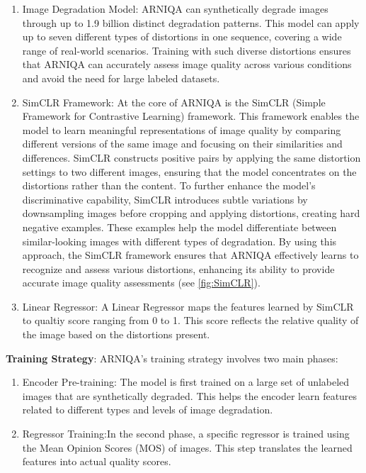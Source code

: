 \begin{enumerate}
    \item Image Degradation Model: ARNIQA can synthetically degrade images through up to 1.9 billion distinct degradation patterns. This model can apply up to seven different types of distortions in one sequence, covering a wide range of real-world scenarios. Training with such diverse distortions ensures that ARNIQA can accurately assess image quality across various conditions and avoid the need for large labeled datasets.
    \item SimCLR Framework: At the core of ARNIQA is the SimCLR (Simple Framework for Contrastive Learning) framework. This framework enables the model to learn meaningful representations of image quality by comparing different versions of the same image and focusing on their similarities and differences. SimCLR constructs positive pairs by applying the same distortion settings to two different images, ensuring that the model concentrates on the distortions rather than the content. To further enhance the model’s discriminative capability, SimCLR introduces subtle variations by downsampling images before cropping and applying distortions, creating hard negative examples. These examples help the model differentiate between similar-looking images with different types of degradation. By using this approach, the SimCLR framework ensures that ARNIQA effectively learns to recognize and assess various distortions, enhancing its ability to provide accurate image quality assessments (see \autoref{fig:SimCLR}).
    \item Linear Regressor: A Linear Regressor maps the features learned by SimCLR to qualtiy score ranging from 0 to 1. This score reflects the relative quality of the image based on the distortions present.
\end{enumerate}
\vspace{\baselineskip}
\noindent
\textbf{Training Strategy}: ARNIQA’s training strategy involves two main phases: \par
\begin{enumerate}
    \item Encoder Pre-training: The model is first trained on a large set of unlabeled images that are synthetically degraded. This helps the encoder learn features related to different types and levels of image degradation.
    \item Regressor Training:In the second phase, a specific regressor is trained using the Mean Opinion Scores (MOS) of images. This step translates the learned features into actual quality scores.
\end{enumerate}
